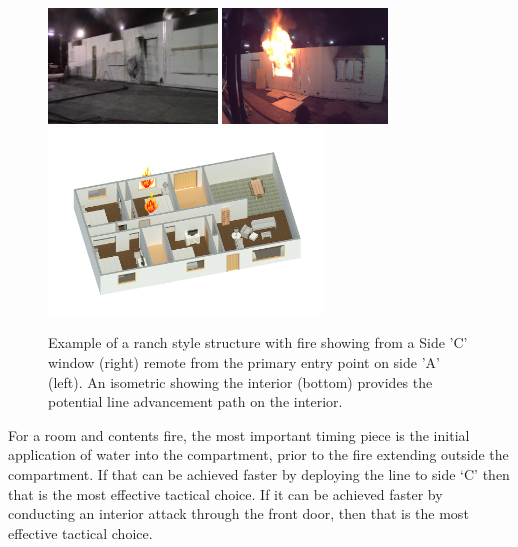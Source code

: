 \documentclass[12pt,oneside]{book}
\begin{document}
\begin{figure}[H]
\centering
\includegraphics[width=0.4\textwidth]{../0_Images/Tactical_Considerations/Fire_Remote_Entry/Side_A}
\includegraphics[width=0.39\textwidth]{../0_Images/Tactical_Considerations/Fire_Remote_Entry/Side_C} 
\includegraphics[width=0.65\textwidth]{../0_Images/Tactical_Considerations/Fire_Remote_Entry/ISO}
\caption[Example - Fire Showing - Remote from Entry Point]{Example of a ranch style structure with fire showing from a Side 'C' window (right) remote from the primary entry point on side 'A' (left). An isometric showing the interior (bottom) provides the potential line advancement path on the interior.}
\label{fig:TC_Fire_Remote_Entry_Example}
\end{figure}

For a room and contents fire, the most important timing piece is the initial application of water into the compartment, prior to the fire extending outside the compartment. If that can be achieved faster by deploying the line to side `C' then that is the most effective tactical choice. If it can be achieved faster by conducting an interior attack through the front door, then that is the most effective tactical choice. 
\end{document}
